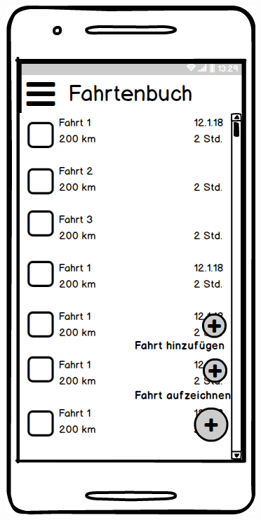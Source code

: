 \documentclass[a4paper]{article}
\begin{document}
\begin{figure}
\begin{minipage}[b]{0.3\textwidth}
    \end{minipage}
    \hspace{0.025\textwidth}%
	\begin{minipage}[b]{0.3\textwidth}
        \includegraphics[width=\textwidth]{img/mock2}

\end{minipage}
\end{figure}
\end{document}
